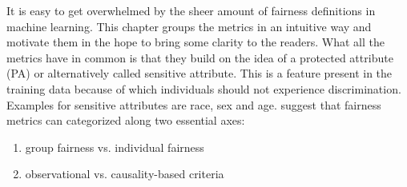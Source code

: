 It is easy to get overwhelmed by the sheer amount of fairness definitions in machine learning. This chapter groups the metrics in an intuitive way and motivate them in the hope to bring some clarity to the readers. What all the metrics have in common is that they build on the idea of a protected attribute (PA) or alternatively called sensitive attribute. This is a feature present in the training data because of which individuals should not experience discrimination. Examples for sensitive attributes are race, sex and age.
\cite{castelnovo2022} suggest that fairness metrics can categorized along two essential axes:
\begin{enumerate}
    \item group fairness vs. individual fairness
    \item observational vs. causality-based criteria
\end{enumerate}

